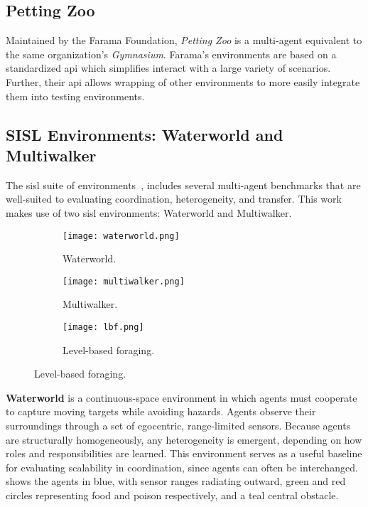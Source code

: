     \subsection*{Petting Zoo}

Maintained by the Farama Foundation, \emph{Petting Zoo} is a 
multi-agent equivalent to the same organization's \emph{Gymnasium}.
Farama's environments are based on a standardized \gls{api}
which simplifies interact with a large variety of scenarios.
Further, their \gls{api} allows wrapping of other environments
to more easily integrate them into testing environments.

   \subsection*{SISL Environments: Waterworld and Multiwalker}

The \gls{sisl} suite of environments~\cite{gupta2017}, includes several 
multi-agent benchmarks that are well-suited to evaluating coordination, 
heterogeneity, and transfer. This work makes use of two \gls{sisl} environments: 
Waterworld and Multiwalker.

\begin{figure}[ht]
    \centering
    \caption{Environments used in this work.}
    \begin{subfigure}{0.3\textwidth}
        \texttt{[image: waterworld.png]}
        \caption{Waterworld.}
        \label{fig:waterworld}
    \end{subfigure}
    \hfil
    \begin{subfigure}{0.3\textwidth}
        \texttt{[image: multiwalker.png]}
        \caption{Multiwalker.}
        \label{fig:multiwalker}
    \end{subfigure}
    \hfil
    \begin{subfigure}{0.3\textwidth}
        \texttt{[image: lbf.png]}
        \caption{Level-based foraging.}
        \label{fig:lbf}
    \end{subfigure}
    \label{fig:envs-overview}
\end{figure}

\textbf{Waterworld} is a continuous-space environment in which agents 
must cooperate to capture moving targets while avoiding hazards. 
Agents observe their surroundings through a set of egocentric, 
range-limited sensors. Because agents are structurally homogeneously, 
any heterogeneity is emergent, depending on how roles and responsibilities 
are learned. This environment serves as a useful baseline for evaluating 
scalability in coordination, since agents can often be interchanged.
 shows the agents in blue, with sensor ranges radiating outward,
green and red circles representing food and poison respectively, and a
teal central obstacle.

